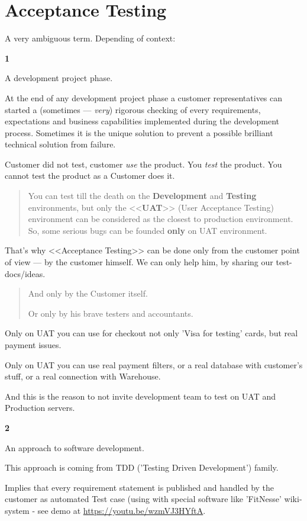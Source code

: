 \section{Acceptance Testing}
\label{sec:Acceptance Testing}

A very ambiguous term. Depending of context:

\textbf{1}

A development project phase.

At the end of any development project phase a customer representatives can started a (sometimes — \emph{very}) rigorous checking of every requirements, expectations and business capabilities implemented during the development process. Sometimes it is the unique solution to prevent a possible brilliant technical solution from failure.

Customer did not test, customer \emph{use} the product. You \emph{test} the product. You cannot test the product as a Customer does it.

\begin{quote}
You can test till the death on the \textbf{Development} and \textbf{Testing} environments, but only the <<\textbf{UAT}>> (User Acceptance Testing) environment can be considered as the closest to production environment. So, some serious bugs can be founded \textbf{only} on UAT environment.                                                                                                                                                                                                                                                                                                                                             \end{quote} 

That's why <<Acceptance Testing>> can be done only from the customer point of view — by the customer himself. We can only help him, by sharing our test-docs/ideas.

\begin{quote}
And only by the Customer itself. 

Or only by his brave testers and accountants.
\end{quote}

Only on UAT you can use for checkout not only 'Visa for testing' cards, but real payment issues.

Only on UAT you can use real payment filters, or a real database with customer's stuff, or a real connection with Warehouse.

And this is the reason to not invite development team to test on UAT and Production servers.

\textbf{2}

An approach to software development.

This approach is coming from TDD ('Testing Driven Development') family.

Implies that every requirement statement is published and handled by the customer as automated Test case (using with special software like 'FitNesse' wiki-system - see demo at \url{https://youtu.be/wzmVJ3HYftA}.